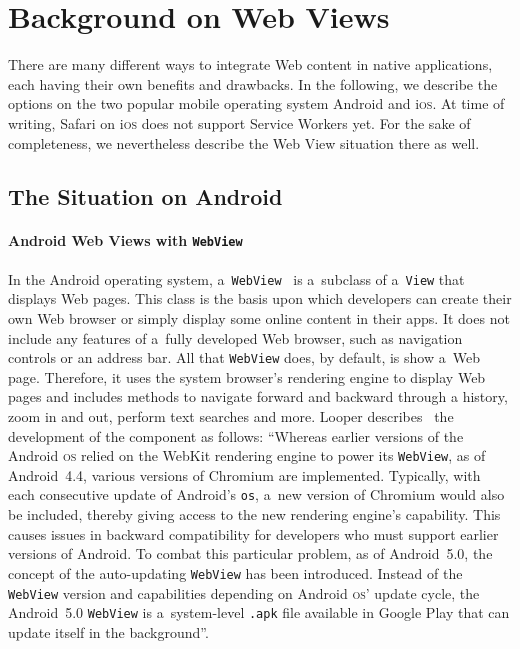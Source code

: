 \documentclass[sigconf]{acmart}
\begin{document}
\section{Background on Web Views}
\label{sec:background}

There are many different ways to integrate Web content in native applications,
each having their own benefits and drawbacks.
In the following, we describe the options on the two popular
mobile operating system Android and i\textsc{os}.
At time of writing, Safari on i\textsc{os} does not support Service Workers yet.
For the sake of completeness, we nevertheless describe the Web View situation there as well.

\subsection{The Situation on Android}

\paragraph{Android Web Views with \texttt{WebView}}

In the Android operating system, a~\texttt{WebView}~\cite{android2018webview}
is a~subclass of a~\texttt{View} that displays Web pages.
This class is the basis upon which developers can create their own Web browser
or simply display some online content in their apps.
It does not include any features of a~fully developed Web browser,
such as navigation controls or an address bar.
All that \texttt{WebView} does, by default, is show a~Web page.
Therefore, it uses the system browser's rendering engine to display Web pages
and includes methods to navigate forward and backward through a history,
zoom in and out, perform text searches and more.
Looper describes~\cite{looper2015webviews}
the development of the component as follows:
``Whereas earlier versions of the Android \textsc{os}
relied on the WebKit rendering engine to power its \texttt{WebView},
as of Android~4.4, various versions of Chromium are implemented.
Typically, with each consecutive update of Android's \texttt{os},
a~new version of Chromium would also be included, thereby giving access
to the new rendering engine's capability.
This causes issues in backward compatibility for developers
who must support earlier versions of Android.
To combat this particular problem, as of Android~5.0,
the concept of the auto-updating \texttt{WebView} has been introduced.
Instead of the \texttt{WebView} version and capabilities
depending on Android \textsc{os}' update cycle,
the Android~5.0 \texttt{WebView} is a~system-level \texttt{.apk} file
available in Google Play that can update itself in the background''.
\end{document}
